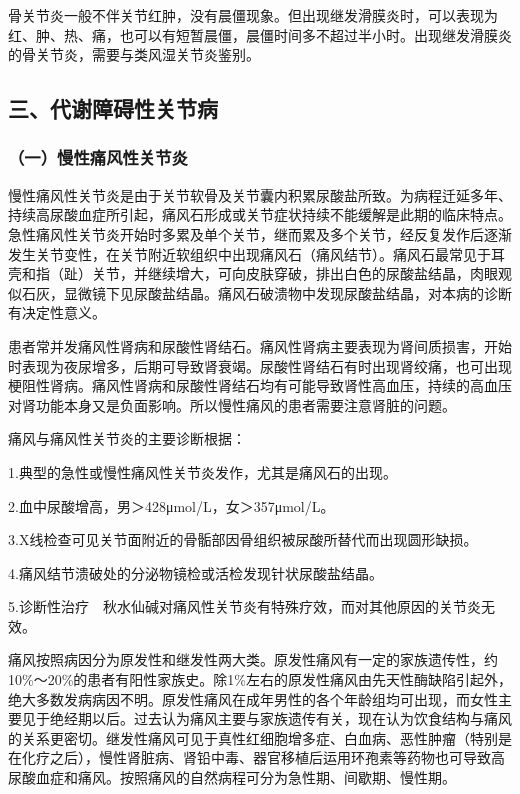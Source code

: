骨关节炎一般不伴关节红肿，没有晨僵现象。但出现继发滑膜炎时，可以表现为红、肿、热、痛，也可以有短暂晨僵，晨僵时间多不超过半小时。出现继发滑膜炎的骨关节炎，需要与类风湿关节炎鉴别。

\subsection{三、代谢障碍性关节病}

\subsubsection{（一）慢性痛风性关节炎}

慢性痛风性关节炎是由于关节软骨及关节囊内积累尿酸盐所致。为病程迁延多年、持续高尿酸血症所引起，痛风石形成或关节症状持续不能缓解是此期的临床特点。急性痛风性关节炎开始时多累及单个关节，继而累及多个关节，经反复发作后逐渐发生关节变性，在关节附近软组织中出现痛风石（痛风结节）。痛风石最常见于耳壳和指（趾）关节，并继续增大，可向皮肤穿破，排出白色的尿酸盐结晶，肉眼观似石灰，显微镜下见尿酸盐结晶。痛风石破溃物中发现尿酸盐结晶，对本病的诊断有决定性意义。

患者常并发痛风性肾病和尿酸性肾结石。痛风性肾病主要表现为肾间质损害，开始时表现为夜尿增多，后期可导致肾衰竭。尿酸性肾结石有时出现肾绞痛，也可出现梗阻性肾病。痛风性肾病和尿酸性肾结石均有可能导致肾性高血压，持续的高血压对肾功能本身又是负面影响。所以慢性痛风的患者需要注意肾脏的问题。

痛风与痛风性关节炎的主要诊断根据：

1.典型的急性或慢性痛风性关节炎发作，尤其是痛风石的出现。

2.血中尿酸增高，男＞428μmol/L，女＞357μmol/L。

3.X线检查可见关节面附近的骨骺部因骨组织被尿酸所替代而出现圆形缺损。

4.痛风结节溃破处的分泌物镜检或活检发现针状尿酸盐结晶。

5.诊断性治疗　秋水仙碱对痛风性关节炎有特殊疗效，而对其他原因的关节炎无效。

痛风按照病因分为原发性和继发性两大类。原发性痛风有一定的家族遗传性，约10\%～20\%的患者有阳性家族史。除1\%左右的原发性痛风由先天性酶缺陷引起外，绝大多数发病病因不明。原发性痛风在成年男性的各个年龄组均可出现，而女性主要见于绝经期以后。过去认为痛风主要与家族遗传有关，现在认为饮食结构与痛风的关系更密切。继发性痛风可见于真性红细胞增多症、白血病、恶性肿瘤（特别是在化疗之后），慢性肾脏病、肾铅中毒、器官移植后运用环孢素等药物也可导致高尿酸血症和痛风。按照痛风的自然病程可分为急性期、间歇期、慢性期。

